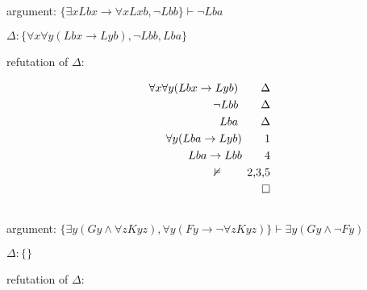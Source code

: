 \documentclass[a4paper,11pt]{article}
\begin{document}

\subsection{}

argument: $\{ \exists x Lbx \rightarrow \forall x Lxb, \lnot Lbb \} \vdash \lnot Lba $

\bigskip

\noindent $\Delta: \{ \forall x \forall y(Lbx \rightarrow Lyb),  \lnot Lbb, Lba \}$

\bigskip

\noindent refutation of $\Delta:$

\begin{align*} 
  \forall x \forall y(Lbx \rightarrow Lyb)        						\tag*{$\Delta$} \\
  \lnot Lbb												\tag*{$\Delta$} \\
  Lba								  		                		\tag*{$\Delta$} \\
  \forall y(Lba \rightarrow Lyb)								\tag*{1} \\
  Lba \rightarrow Lbb										\tag*{4} \\
  \nvDash												\tag*{2,3,5} \\
  \qedhere
\end{align*}


\subsection{}

argument: $\{ \exists y(Gy \land \forall z Kyz), \forall y(Fy \rightarrow \lnot \forall z Kyz) \} \vdash \exists y(Gy \land \lnot Fy) $

\bigskip

\noindent $\Delta: \{ \} $

\bigskip

\noindent refutation of $\Delta:$
\end{document}
